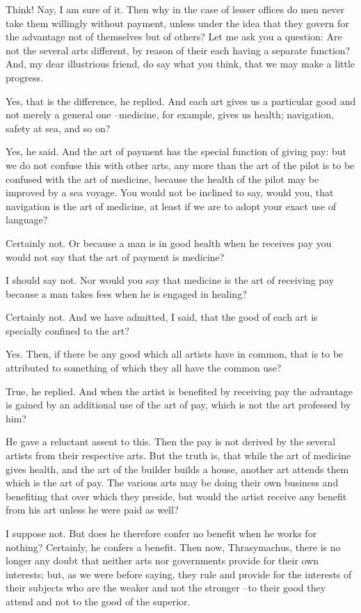 Think! Nay, I am sure of it.
Then why in the case of lesser offices do men never take them willingly without payment, unless under the idea that they govern for the advantage not of themselves but of others? Let me ask you a question: Are not the several arts different, by reason of their each having a separate function? And, my dear illustrious friend, do say what you think, that we may make a little progress.

Yes, that is the difference, he replied.
And each art gives us a particular good and not merely a general one --medicine, for example, gives us health; navigation, safety at sea, and so on?

Yes, he said.
And the art of payment has the special function of giving pay: but we do not confuse this with other arts, any more than the art of the pilot is to be confused with the art of medicine, because the health of the pilot may be improved by a sea voyage. You would not be inclined to say, would you, that navigation is the art of medicine, at least if we are to adopt your exact use of language?

Certainly not.
Or because a man is in good health when he receives pay you would not say that the art of payment is medicine?

I should say not.
Nor would you say that medicine is the art of receiving pay because a man takes fees when he is engaged in healing?

Certainly not.
And we have admitted, I said, that the good of each art is specially confined to the art?

Yes.
Then, if there be any good which all artists have in common, that is to be attributed to something of which they all have the common use?

True, he replied.
And when the artist is benefited by receiving pay the advantage is gained by an additional use of the art of pay, which is not the art professed by him?

He gave a reluctant assent to this.
Then the pay is not derived by the several artists from their respective arts. But the truth is, that while the art of medicine gives health, and the art of the builder builds a house, another art attends them which is the art of pay. The various arts may be doing their own business and benefiting that over which they preside, but would the artist receive any benefit from his art unless he were paid as well?

I suppose not.
But does he therefore confer no benefit when he works for nothing?
Certainly, he confers a benefit.
Then now, Thrasymachus, there is no longer any doubt that neither arts nor governments provide for their own interests; but, as we were before saying, they rule and provide for the interests of their subjects who are the weaker and not the stronger --to their good they attend and not to the good of the superior.


